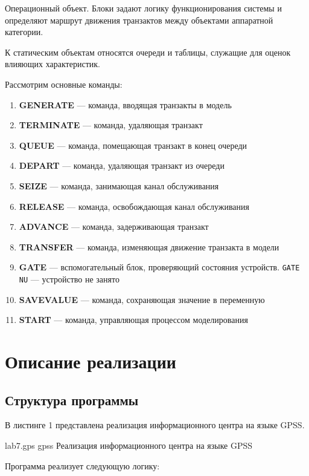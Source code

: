 Операционный объект. Блоки задают логику функционирования системы и определяют маршрут движения транзактов между объектами аппаратной категории.

К статическим объектам относятся очереди и таблицы, служащие для оценок влияющих характеристик.

Рассмотрим основные команды:

\begin{enumerate}
    \item \textbf{GENERATE} — команда, вводящая транзакты в модель
    \item \textbf{TERMINATE} — команда, удаляющая транзакт
    \item \textbf{QUEUE} — команда, помещающая транзакт в конец очереди
    \item \textbf{DEPART} — команда, удаляющая транзакт из очереди
    \item \textbf{SEIZE} — команда, занимающая канал обслуживания
    \item \textbf{RELEASE} — команда, освобождающая канал обслуживания
    \item \textbf{ADVANCE} — команда, задерживающая транзакт
    \item \textbf{TRANSFER} — команда, изменяющая движение транзакта в модели
    \item \textbf{GATE} — вспомогательный блок, проверяющий состояния устройств. \texttt{GATE NU} — устройство не занято
    \item \textbf{SAVEVALUE} — команда, сохраняющая значение в переменную
    \item \textbf{START} — команда, управляющая процессом моделирования
\end{enumerate}

\section{Описание реализации}

\subsection{Структура программы}

В листинге 1 представлена реализация информационного центра на языке GPSS.

    {lab7.gps}
    {gpss}
    {Реализация информационного центра на языке GPSS}

Программа реализует следующую логику:

